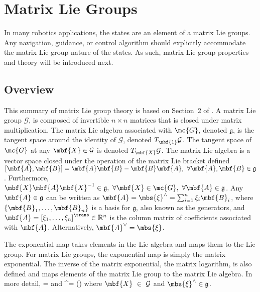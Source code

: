 
\section{Matrix Lie Groups}

In many robotics applications, the states are an element of a matrix Lie groups. Any navigation, guidance, or control algorithm should explicitly accommodate the matrix Lie group nature of the states. As such, matrix Lie group properties and theory will be introduced next. 

\subsection{Overview}

This summary of matrix Lie group theory is based on Section~2 of \cite{Eade2013}. A matrix Lie group $\mathcal{G}$, is composed of invertible $n \times n$ matrices that is closed under matrix multiplication. The matrix Lie algebra associated with $\mc{G}$, denoted $\mathfrak{g}$, is the tangent space around the identity of $\mathcal{G}$, denoted $T_\mbf{1}\mathcal{G}$. The tangent space of $\mc{G}$ at any $\mbf{X} \in \mathcal{G}$ is denoted $T_\mbf{X}\mathcal{G}$. The matrix Lie algebra is a vector space closed under the operation of the matrix Lie bracket defined $[\mbf{A},\mbf{B}] = \mbf{A}\mbf{B} - \mbf{B}\mbf{A}, \ \forall \mbf{A},\mbf{B} \in \mathfrak{g}$. Furthermore, $\mbf{X}\mbf{A}\mbf{X}^{-1}  \in \mathfrak{g}, \ \forall\mbf{X} \in \mc{G}, \ \forall \mbf{A} \in \mathfrak{g}$. Any $\mbf{A} \in \mathfrak{g}$ can be written as $\mbf{A} = \mbs{\xi}^\wedge = \sum_{i=1}^{n} \xi_i \mbf{B}_i$, where $\{\mbf{B}_1, \ldots ,\mbf{B}_n\}$ is a basis for $\mathfrak{g}$, also known as the generators, and $\mbf{A} = \left[\xi_1,\ldots,\xi_n\right]^\trans \in \mathbb{R}^n$ is the column matrix of coefficients associated with $\mbf{A}$. Alternatively, $\mbf{A}^\vee = \mbs{\xi}$.

The exponential map takes elements in the Lie algebra and maps them to the Lie group. For matrix Lie groups, the exponential map is simply the matrix exponential. The inverse of the matrix exponential, the matrix logarithm, is also defined and maps elements of the matrix Lie group to the matrix Lie algebra. In more detail, 
\bdis
	 = \expmapw{\mbs{\xi}}
\edis
and
\bdis
	\mbs{\xi}^\wedge = \log()
\edis
where $\mbf{X}~\in~\mathcal{G}$ and $\mbs{\xi}^\wedge \in \mathfrak{g}$.

